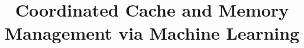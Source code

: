 \documentclass[11pt]{article}
\begin{document}
\title{Coordinated Cache and Memory Management via Machine Learning}




\date{}
\maketitle

%






\newpage
\linespread{0.8}
\begin{small}


\end{small}
\end{document}
